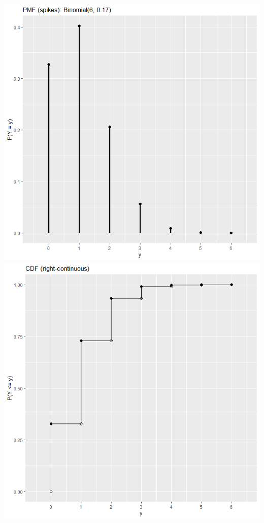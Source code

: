 \documentclass[12pt]{article}
\newenvironment{problem}[2][Problem]{\begin{trivlist}
\item[\hskip \labelsep {\bfseries #1}\hskip \labelsep {\bfseries #2.}]}
{\end{trivlist}}
\begin{document}
\begin{problem}{6}
\begin{enumerate}
\begin{center}
      \includegraphics[width=\textwidth]{6pmf.png}
      \includegraphics[width=\textwidth]{6cdf.png}
    \end{center}
  \end{enumerate}

\end{problem}
\end{document}
